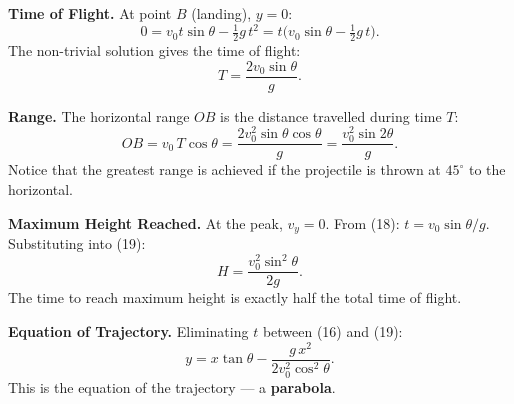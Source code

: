\textbf{Time of Flight.} At point $B$ (landing), $y=0$:
\[
  0 = v_0 t\sin\theta - \tfrac{1}{2}g\,t^2 = t\bigl(v_0\sin\theta - \tfrac{1}{2}g\,t\bigr).
\]
The non-trivial solution gives the time of flight:
\begin{equation}
  T = \frac{2v_0\sin\theta}{g}.
\end{equation}

\textbf{Range.} The horizontal range $OB$ is the distance travelled during time $T$:
\begin{equation}
  OB = v_0\,T\cos\theta = \frac{2v_0^2\sin\theta\cos\theta}{g} = \frac{v_0^2\sin2\theta}{g}.
\end{equation}
Notice that the greatest range is achieved if the projectile is thrown at $45^\circ$ to the
horizontal.

\textbf{Maximum Height Reached.} At the peak, $v_y=0$. From (18): $t=v_0\sin\theta/g$. Substituting into (19):
\begin{equation}
  H = \frac{v_0^2\sin^2\theta}{2g}.
\end{equation}
The time to reach maximum height is exactly half the total time of flight.

\textbf{Equation of Trajectory.} Eliminating $t$ between (16) and (19):
\begin{equation}
  y = x\tan\theta - \frac{g\,x^2}{2v_0^2\cos^2\theta}.
\end{equation}
This is the equation of the trajectory --- a \textbf{parabola}.
